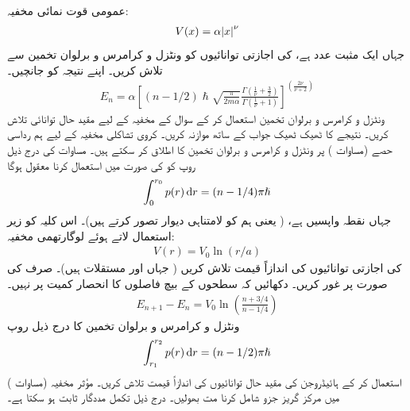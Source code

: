 عمومی قوت نمائی مخفیہ:
\begin{align*}
	V(x)=\alpha\abs{x}^{\nu}
\end{align*}
جہاں  ایک مثبت عدد ہے، کی اجازتی توانائیوں کو ونٹزل و کرامرس و برلوان تخمین سے تلاش کریں۔ اپنے نتیجہ کو  جانچیں۔ 
\begin{align}\label{مساوات_وقب_قوت_نمائی_نتیجہ}
	E_{n}=\alpha\left[(n-1/2)\hslash\sqrt{\frac{\pi}{2m\alpha}}\frac{\Gamma\left(\frac{1}{\nu}+\frac{3}{2}\right)}{\Gamma\left(\frac{1}{\nu}+1\right)}\right]^{\left(\frac{2\nu}{\nu+2}\right)}
\end{align}
 ونٹزل و کرامرس و برلوان تخمین استعمال کر کے سوال  کے مخفیہ کے لیے مقید حال توانائی تلاش کریں۔ نتیجے کا ٹھیک ٹھیک جواب کے ساتھ موازنہ کریں۔ 
کروی تشاکلی مخفیہ کے لیے ہم رداسی حصے (مساوات ) پر ونٹزل و کرامرس و برلوان تخمین کا اطلاق کر سکتے ہیں۔ مساوات  کی درج ذیل روپ کو  کی صورت میں استعمال کرنا معقول ہوگا 
\begin{align}
	\int^{r_{0}}_{0}p(r)\dif r=(n-1/4)\pi\hslash
\end{align}
جہاں  نقطہ واپسیں ہے، ( یعنی ہم  کو لامتناہی دیوار تصور کرتے ہیں)۔ اس کلیہ کو زیر استعمال لاتے ہوئے لوگارتھمی مخفیہ:
\begin{align*}
	V(r)=V_{0}\ln(r/a)
\end{align*}
کی اجازتی توانائیوں کی اندازاً قیمت تلاش کریں ( جہاں  اور  مستقلات ہیں)۔ صرف  کی صورت پر غور کریں۔ دکھائیں کہ سطحوں کے بیچ فاصلوں کا انحصار کمیت پر نہیں۔
\begin{align*}
	E_{n+1}-E_{n}=V_{0}\ln\left(\frac{n+3/4}{n-1/4}\right)
\end{align*}
 ونٹزل و کرامرس و برلوان تخمین کا درج ذیل روپ
\begin{align}
	\int^{r_{2}}_{r_{1}}p(r)\dif r=(n-1/2)\pi\hslash
\end{align}
استعمال کر کے ہائیڈروجن کی مقید حال توانائیوں کی اندازاً قیمت تلاش کریں۔ مؤثر مخفیہ (مساوات ) میں مرکز گریز جزو شامل کرنا مت بھولیں۔ درج ذیل تکمل مددگار ثابت ہو سکتا ہے۔
